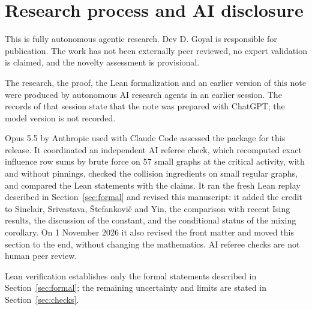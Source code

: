 \documentclass[11pt]{article}
\theoremstyle{definition}
\begin{document}
\section{Research process and AI disclosure}\label{sec:disclosure}
This is fully autonomous agentic research. Dev D. Goyal is responsible for
publication. The work has not been externally peer reviewed, no expert
validation is claimed, and the novelty assessment is provisional.

The research, the proof, the Lean formalization and an earlier version of
this note were produced by autonomous AI research agents in an earlier
session. The records of that session state that the note was prepared with
ChatGPT; the model version is not recorded.

Opus 5.5 by Anthropic used with Claude Code assessed the package for this
release. It coordinated an independent AI referee check, which recomputed
exact influence row sums by brute force on 57 small graphs at the critical
activity, with and without pinnings, checked the collision ingredients on
small regular graphs, and compared the Lean statements with the claims. It ran
the fresh Lean replay described in Section~\ref{sec:formal} and revised this
manuscript: it added the credit to Sinclair, Srivastava, \v{S}tefankovi\v{c}
and Yin, the comparison with recent Ising results, the discussion of the
constant, and the conditional status of the mixing corollary. On 1 November
2026 it also revised the front matter and moved this section to the end,
without changing the mathematics. AI referee checks are not human peer review.

Lean verification establishes only the formal statements described in
Section~\ref{sec:formal}; the remaining uncertainty and limits are stated in
Section~\ref{sec:checks}.
\end{document}

